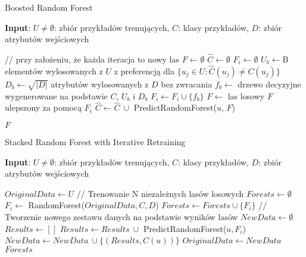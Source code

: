 \documentclass[10pt,a4paper]{article}
\begin{document}
\begin{algorithm}[h]
	\caption{Boosted Random Forest}\label{alg:caprf_train}
	\hspace*{\algorithmicindent} \textbf{Input}: $U\neq \emptyset$: zbiór przykładów trenujących, $C$: klasy przykładów, $D$: zbiór atrybutów wejściowych
\begin{algorithmic}
	\State 	// przy założeniu, że każda iteracja to nowy las
	\State $F \gets \emptyset$
	\State $\hat C \gets \emptyset$
		\State $F_i \gets \emptyset$
			\State $U_b \gets $B elementów wylosowanych z $U$ z preferencją dla $\{u_j \in U: \hat C(u_j) \neq C(u_j)\}$
			\State $D_b \gets \sqrt{|D|} $ atrybutów wylosowanych z $D$ bez zwracania
			\State $f_b \gets $ drzewo decyzyjne wygenerowane na podstawie $C$, $U_b$ i $D_b$
			\State $F_i \gets F_i \cup \{f_b\}$
		\EndFor
		\State $F \gets $ las losowy $F$ ulepszony za pomocą $F_i$
			\State $\hat C \gets \hat C\ \cup$ PredictRandomForest($u$, $F$)
		\EndFor
		
	\EndFor
	\State \Return $F$
\end{algorithmic}
\end{algorithm}




\begin{algorithm}[H]
    \caption{Stacked Random Forest with Iterative Retraining}\label{alg:iterative_stacked_rf}
    \hspace*{\algorithmicindent} \textbf{Input}: $U\neq \emptyset$: zbiór przykładów trenujących, $C$: klasy przykładów, $D$: zbiór atrybutów wejściowych
    \begin{algorithmic}
        \State $OriginalData \gets U$
            \State // Trenowanie N niezależnych lasów losowych
            \State $Forests \gets \emptyset$
                \State $F_i \gets $ RandomForest($OriginalData, C, D$)
                \State $Forests \gets Forests \cup \{F_i\}$
            \EndFor
            \State // Tworzenie nowego zestawu danych na podstawie wyników lasów
            \State $NewData \gets \emptyset$
                \State $Results \gets []$
                    \State $Results \gets Results\ \cup$ PredictRandomForest($u, F_i$)
                \EndFor
                \State $NewData \gets NewData\ \cup \{(Results, C(u))\}$
            \EndFor
            \State $OriginalData \gets NewData$
        \EndFor
        \State \Return $Forests$
    \end{algorithmic}
\end{algorithm}
\end{document}
